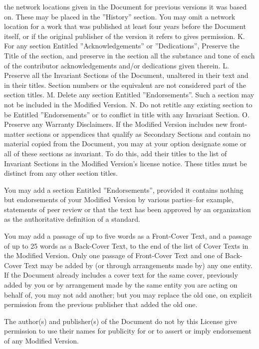 the network locations given in the Document for previous versions it was based on. These may be placed in the
''History'' section. You may omit a network location for a work that was published at least four years before the
Document itself, or if the original publisher of the version it refers to gives permission. K. For any section Entitled
''Acknowledgements'' or ''Dedications'', Preserve the Title of the section, and preserve in the section all the
substance and tone of each of the contributor acknowledgements and/or dedications given therein. L. Preserve all the
Invariant Sections of the Document, unaltered in their text and in their titles. Section numbers or the equivalent are
not considered part of the section titles. M. Delete any section Entitled ''Endorsements''. Such a section may not be
included in the Modified Version. N. Do not retitle any existing section to be Entitled ''Endorsements'' or to conflict
in title with any Invariant Section. O. Preserve any Warranty Disclaimers. If the Modified Version includes new
front-matter sections or appendices that qualify as Secondary Sections and contain no material copied from the
Document, you may at your option designate some or all of these sections as invariant. To do this, add their titles to
the list of Invariant Sections in the Modified Version's license notice. These titles must be distinct from any other
section titles.

You may add a section Entitled ''Endorsements'', provided it contains nothing but endorsements of your Modified Version
by various parties--for example, statements of peer review or that the text has been approved by an organization as the
authoritative definition of a standard.

You may add a passage of up to five words as a Front-Cover Text, and a passage of up to 25 words as a Back-Cover Text,
to the end of the list of Cover Texts in the Modified Version. Only one passage of Front-Cover Text and one of
Back-Cover Text may be added by (or through arrangements made by) any one entity. If the Document already includes a
cover text for the same cover, previously added by you or by arrangement made by the same entity you are acting on
behalf of, you may not add another; but you may replace the old one, on explicit permission from the previous publisher
that added the old one.

The author(s) and publisher(s) of the Document do not by this License give permission to use their names for publicity
for or to assert or imply endorsement of any Modified Version.

